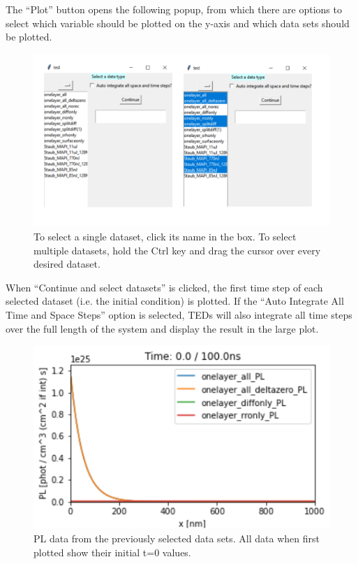 \documentclass[11pt,letterpaper,titlepage]{article}
\begin{document}
		\par The “Plot” button opens the following popup, from which there are options to select which variable should be plotted on the y-axis and which data sets should be plotted.
		
		\begin{figure}[H]
			\label{fig:plotting_example}
			\centering
			\includegraphics[scale=1]{"plotting_example"}
			\caption{To select a single dataset, click its name in the box. 
			To select multiple datasets, hold the Ctrl key and drag the cursor over every desired dataset.
			}
		\end{figure}
	
		\par When “Continue and select datasets” is clicked, the first time step of each selected dataset (i.e. the initial condition) is plotted. If the “Auto Integrate All Time and Space Steps” option is selected, TEDs will also integrate all time steps over the full length of the system and display the result in the large plot.
		
		\begin{figure}[H]
			\label{fig:analyze_example}
			\centering
			\includegraphics[scale=1]{"analyze_example"}
			\caption{PL data from the previously selected data sets. All data when first plotted show their initial t=0 values.}
		\end{figure}
	
\end{document}
